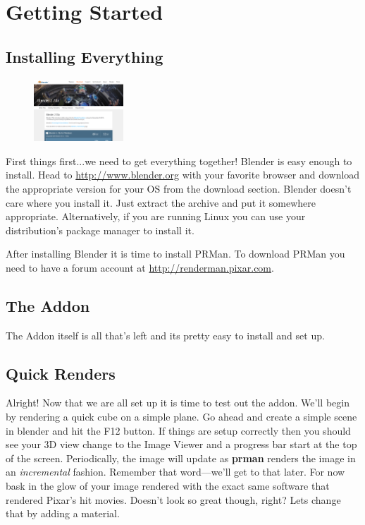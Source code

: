 \chapter{Getting Started}  %
\section{Installing Everything}
\begin{figure}
	\includegraphics[width=0.3\textwidth]{figures/c01-blenderdownload}
\end{figure}
First things first...we need to get everything together!
Blender is easy enough to install.  Head to \url{http://www.blender.org} with your favorite browser and download the appropriate version for your OS from the download section.  Blender doesn't care where you install it.  Just extract the archive and put it somewhere appropriate.  Alternatively, if you are running Linux you can use your distribution's package manager to install it.



After installing Blender it is time to install PRMan.  To download PRMan you need to have a forum account at \url{http://renderman.pixar.com}.

\section{The Addon}

The Addon itself is all that's left and its pretty easy to install and set up.

\section{Quick Renders}

Alright!  Now that we are all set up it is time to test out the addon.  We'll begin by rendering a quick cube on a simple plane.  Go ahead and create a simple scene in blender and hit the \textsf{F12} button.  
If things are setup correctly then you should see your 3D view change to the Image Viewer and a progress bar start at the top of the screen.  Periodically, the image will update as \textbf{prman} renders the image in an \emph{incremental} fashion.  Remember that word---we'll get to that later.  For now bask in the glow of your image rendered with the exact same software that rendered Pixar's hit movies.  Doesn't look so great though, right?  Lets change that by adding a material.

